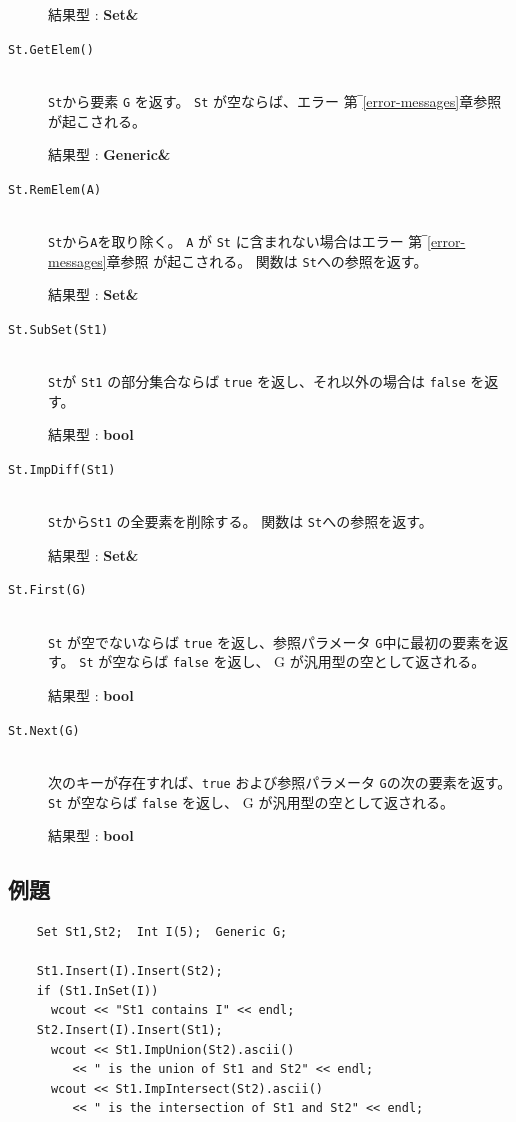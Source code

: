 \documentclass[\pformat,12pt]{jarticle}
\begin{document}
\begin{description}
     結果型 : {\bf Set\&}

\item[{\tt St.GetElem()}] \mbox{}\\     
     {\tt St}から要素 {\tt G} を返す。 
 {\tt St} が空ならば、エラー 第‾\ref{error-messages}章参照 が起こされる。

     結果型 : {\bf Generic\&}

\item[{\tt St.RemElem(A)}] \mbox{}\\     
     {\tt St}から{\tt A}を取り除く。 
     {\tt A} が {\tt St} に含まれない場合はエラー 第‾\ref{error-messages}章参照 が起こされる。 
     関数は {\tt St}への参照を返す。

     結果型 : {\bf Set\&}

\item[{\tt St.SubSet(St1)}] \mbox{}\\     
     {\tt St}が {\tt St1} の部分集合ならば {\tt true} を返し、それ以外の場合は {\tt false} を返す。

     結果型 : {\bf bool}

\item[{\tt St.ImpDiff(St1)}] \mbox{}\\     
    {\tt St}から{\tt St1} の全要素を削除する。
     関数は {\tt St}への参照を返す。

     結果型 : {\bf Set\&}

\item[{\tt St.First(G)}] \mbox{}\\     
     {\tt St} が空でないならば {\tt true} を返し、参照パラメータ {\tt G}中に最初の要素を返す。 
 {\tt St} が空ならば {\tt false} を返し、 G が汎用型の空として返される。

     結果型 : {\bf bool}
    
\item[{\tt St.Next(G)}] \mbox{}\\     
      次のキーが存在すれば、{\tt true} および参照パラメータ {\tt G}の次の要素を返す。
 {\tt St} が空ならば {\tt false} を返し、 G が汎用型の空として返される。

     結果型 : {\bf bool}
\end{description}

\subsection*{例題}
\begin{verbatim}
    Set St1,St2;  Int I(5);  Generic G;

    St1.Insert(I).Insert(St2);
    if (St1.InSet(I))
      wcout << "St1 contains I" << endl;
    St2.Insert(I).Insert(St1);
      wcout << St1.ImpUnion(St2).ascii() 
         << " is the union of St1 and St2" << endl;
      wcout << St1.ImpIntersect(St2).ascii() 
         << " is the intersection of St1 and St2" << endl;
\end{verbatim}
\end{document}
